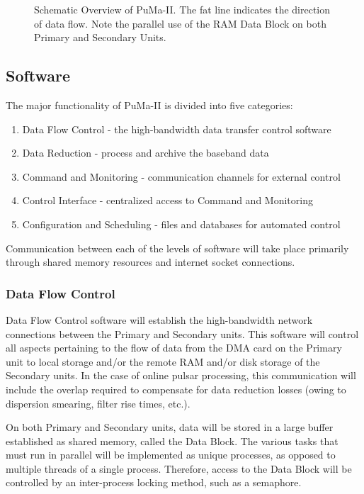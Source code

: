 \begin{figure}
\centerline{}
\caption [\sffamily PuMa-II Schematic Overview]
{
Schematic Overview of PuMa-II.  The fat line indicates the direction
of data flow.  Note the parallel use of the RAM Data Block on both
Primary and Secondary Units.
}
\label{fig:layout}
\end{figure}

\subsection{Software}

The major functionality of PuMa-II is divided into five categories:

\begin{enumerate}

\item Data Flow Control - the high-bandwidth data transfer control software
\item Data Reduction - process and archive the baseband data
\item Command and Monitoring - communication channels for external control
\item Control Interface - centralized access to Command and Monitoring
\item Configuration and Scheduling - files and databases for automated control

\end{enumerate}

Communication between each of the levels of software will take place
primarily through shared memory resources and internet socket
connections.

\subsubsection{Data Flow Control}

Data Flow Control software will establish the high-bandwidth network
connections between the Primary and Secondary units.  This software
will control all aspects pertaining to the flow of data from the DMA
card on the Primary unit to local storage and/or the remote RAM and/or
disk storage of the Secondary units.  In the case of online pulsar
processing, this communication will include the overlap required to
compensate for data reduction losses (owing to dispersion smearing,
filter rise times, etc.).  

On both Primary and Secondary units, data will be stored in a large
buffer established as shared memory, called the Data Block.  The
various tasks that must run in parallel will be implemented as unique
processes, as opposed to multiple threads of a single process.
Therefore, access to the Data Block will be controlled by an
inter-process locking method, such as a semaphore.

